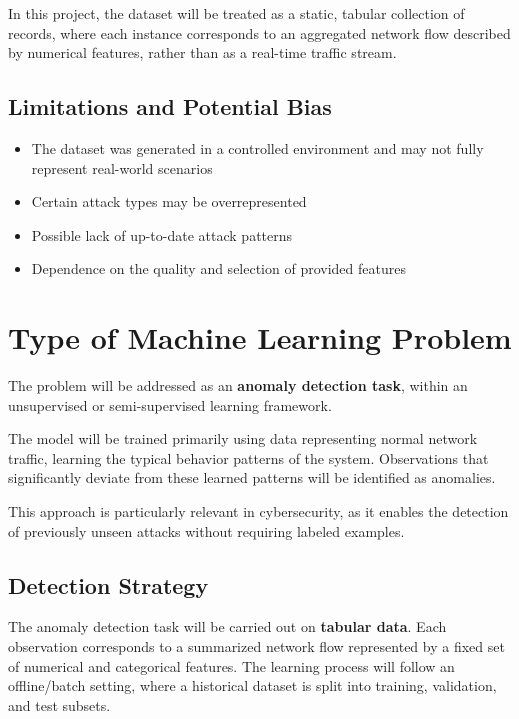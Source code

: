 \documentclass[11pt]{article}
\begin{document}
In this project, the dataset will be treated as a static, tabular collection of records, where each instance corresponds to an aggregated network flow described by numerical features, rather than as a real-time traffic stream.

\subsection{Limitations and Potential Bias}

\begin{itemize}
    \item The dataset was generated in a controlled environment and may not fully represent real-world scenarios
    \item Certain attack types may be overrepresented
    \item Possible lack of up-to-date attack patterns
    \item Dependence on the quality and selection of provided features
\end{itemize}

\section{Type of Machine Learning Problem}

The problem will be addressed as an \textbf{anomaly detection task}, within an unsupervised or semi-supervised learning framework.

The model will be trained primarily using data representing normal network traffic, learning the typical behavior patterns of the system. Observations that significantly deviate from these learned patterns will be identified as anomalies.

This approach is particularly relevant in cybersecurity, as it enables the detection of previously unseen attacks without requiring labeled examples.

\subsection{Detection Strategy}

The anomaly detection task will be carried out on \textbf{tabular data}. Each observation corresponds to a summarized network flow represented by a fixed set of numerical and categorical features. The learning process will follow an offline/batch setting, where a historical dataset is split into training, validation, and test subsets.
\end{document}
